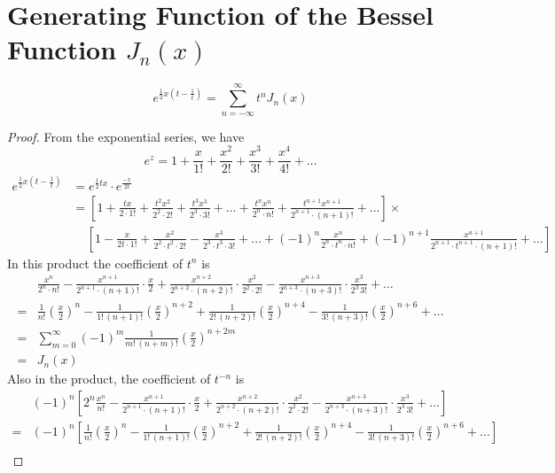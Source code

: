 \documentclass[../main-sheet.tex]{subfiles}
\begin{document}
\section{Generating Function of the Bessel Function $ J_n(x) $}
\[
    e^{\frac{1}{2}x\left( t-\frac{1}{t} \right)}=\sum_{n=-\infty}^\infty t^n J_n(x)
\]
\begin{proof}
    From the exponential series, we have
    \begin{equation}
        e^z=1+\frac{x}{1!}+\frac{x^2}{2!}+\frac{x^3}{3!}+\frac{x^4}{4!}+\dots
        \label{eq:gen}
    \end{equation}
    \begin{align*}
        e^{\frac{1}{2}x\left( t-\frac{1}{t} \right)}&=e^{\frac{1}{2}tx}\cdot e^{\frac{-x}{2t}}\\
        &=\left[ 1+\frac{tx}{2\cdot 1!}+\frac{t^2 x^2}{2^2\cdot2!}+\frac{t^3x^3}{2^3\cdot3!}+\dots+\frac{t^nx^n}{2^n\cdot n!}+\frac{t^{n+1}x^{n+1}}{2^{n+1}\cdot (n+1)!}+\dots \right] \times\\
        &\quad\, \left[ 1-\frac{x}{2t\cdot 1!}+\frac{x^2}{2^2\cdot t^2\cdot2!}-\frac{x^3}{2^3\cdot t^3\cdot3!}+\dots+(-1)^n\frac{x^n}{2^n\cdot t^n \cdot n!}+(-1)^{n+1}\frac{x^{n+1}}{2^{n+1}\cdot t^{n+1}\cdot (n+1)!}+\dots \right]
    \end{align*}
    In this product the coefficient of $ t^n $ is 
    \begin{align*}
        & \frac{x^n}{2^n\cdot n!}-\frac{x^{n+1}}{2^{n+1}\cdot (n+1)!}\cdot\frac{x}{2}+\frac{x^{n+2}}{2^{n+2}\cdot (n+2)!}\cdot\frac{x^2}{2^2\cdot 2!}-\frac{x^{n+3}}{2^{n+3}\cdot (n+3)!}\cdot\frac{x^3}{2^3\,3!}+\dots\\
        =& \frac{1}{n!}\left( \frac{x}{2} \right)^n-\frac{1}{1!\,(n+1)!}\left( \frac{x}{2} \right)^{n+2}+\frac{1}{2!\,(n+2)!}\left( \frac{x}{2} \right)^{n+4}-\frac{1}{3!\,(n+3)!}\left( \frac{x}{2} \right)^{n+6}+\dots\\
        =& \sum_{m=0}^\infty (-1)^m \frac{1}{m!\,(n+m)!}\left( \frac{x}{2} \right)^{n+2m}\\
        =& J_n(x)
    \end{align*}
    Also in the product, the coefficient of $ t^{-n} $ is
    \begin{align*}
        & (-1)^n \left[ 2^n \frac{x^n}{n!}-\frac{x^{n+1}}{2^{n+1}\cdot (n+1)!}\cdot\frac{x}{2}+\frac{x^{n+2}}{2^{n+2}\cdot (n+2)!}\cdot\frac{x^2}{2^2\cdot 2!}-\frac{x^{n+3}}{2^{n+3}\cdot (n+3)!}\cdot\frac{x^3}{2^3\,3!}+\dots\right]\\
        =&(-1)^n \left[\frac{1}{n!}\left( \frac{x}{2} \right)^n-\frac{1}{1!\,(n+1)!}\left( \frac{x}{2} \right)^{n+2}+\frac{1}{2!\,(n+2)!}\left( \frac{x}{2} \right)^{n+4}-\frac{1}{3!\,(n+3)!}\left( \frac{x}{2} \right)^{n+6}+\dots\right]\\

\end{align*}
\end{proof}
\end{document}
